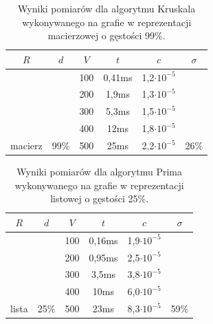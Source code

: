 \documentclass[a4paper,12pt]{article}
\begin{document}
\begin{table}[H]
	\centering
	\caption{\centering Wyniki pomiarów dla algorytmu Kruskala wykonywanego na grafie w reprezentacji macierzowej o gęstości 99\%.}
	\begin{tabular}{|c|c|c|c|c|c|}
		\hline
		\rowcolor[HTML]{C0C0C0} 
		$R$                       & $d$                    & $V$ & $t$    & $c$                & $\sigma$               \\ \hline
		&                        & 100 & 0,41ms & 1,2$\cdot 10^{-5}$ &                        \\ \cline{3-5}
		&                        & 200 & 1,9ms  & 1,3$\cdot 10^{-5}$ &                        \\ \cline{3-5}
		&                        & 300 & 5,3ms  & 1,5$\cdot 10^{-5}$ &                        \\ \cline{3-5}
		&                        & 400 & 12ms   & 1,8$\cdot 10^{-5}$ &                        \\ \cline{3-5}
		\multirow{-5}{*}{macierz} & \multirow{-5}{*}{99\%} & 500 & 25ms   & 2,2$\cdot 10^{-5}$ & \multirow{-5}{*}{26\%} \\ \hline
	\end{tabular}
\end{table}

\begin{table}[H]
	\centering
	\caption{\centering Wyniki pomiarów dla algorytmu Prima wykonywanego na grafie w reprezentacji listowej o gęstości 25\%.}
	\begin{tabular}{|c|c|c|c|c|c|}
		\hline
		\rowcolor[HTML]{C0C0C0} 
		$R$                     & $d$                    & $V$ & $t$    & $c$                & $\sigma$               \\ \hline
		&                        & 100 & 0,16ms & 1,9$\cdot 10^{-5}$ &                        \\ \cline{3-5}
		&                        & 200 & 0,95ms & 2,5$\cdot 10^{-5}$ &                        \\ \cline{3-5}
		&                        & 300 & 3,5ms  & 3,8$\cdot 10^{-5}$ &                        \\ \cline{3-5}
		&                        & 400 & 10ms   & 6,0$\cdot 10^{-5}$ &                        \\ \cline{3-5}
		\multirow{-5}{*}{lista} & \multirow{-5}{*}{25\%} & 500 & 23ms   & 8,3$\cdot 10^{-5}$ & \multirow{-5}{*}{59\%} \\ \hline
	\end{tabular}
\end{table}
\end{document}
